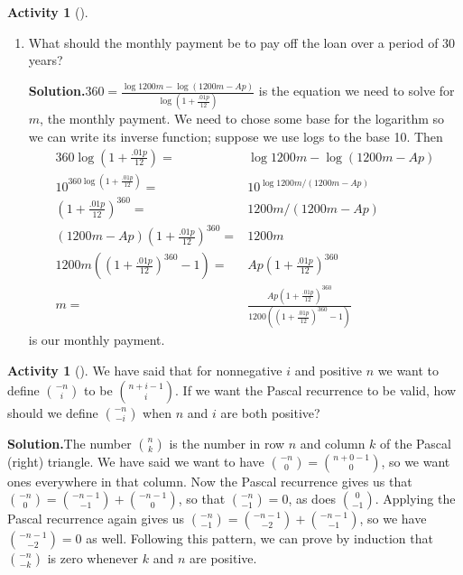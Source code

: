 \documentclass[10pt,]{book}
\theoremstyle{plain}
\theoremstyle{definition}
\newtheorem{activity}[project]{Activity}
\numberwithin{equation}{chapter}
\newcommand{\amp}{&}
\begin{document}
\begin{activity}[]
\begin{enumerate}[label=(\alph*)]
~\par
\item What should the monthly payment be to pay off the loan over a period of 30 years?%
\par\medskip\noindent%
\textbf{Solution.}\quad \(360=\frac{\log
1200m-\log (1200m-Ap)}{\log (1+\frac{.01p}{12})}\) is the equation we need to solve for \(m\), the monthly payment. We need to chose some base for the logarithm so we can write its inverse function; suppose we use logs to the base 10. Then%
\begin{align*}
360\log (1+\frac{.01p}{12})  =\amp  \log
1200m-\log (1200m-Ap)\\
10^{360\log (1+\frac{.01p}{12})} =\amp 10^{\log
1200m/(1200m-Ap)}\\
(1+\frac{.01p}{12})^{360}  =\amp 1200m/(1200m-Ap)\\
\left(1200m-Ap\right)(1+\frac{.01p}{12})^{360} =\amp 1200m\\
1200m\left((1+\frac{.01p}{12})^{360}-1\right) =\amp  Ap(1+\frac{.01p}{12})^{360}\\
m  =\amp  \frac{Ap(1+\frac{.01p}{12})^{360}}{1200\left((1+\frac{.01p}{12})^{360}-1\right)}
\end{align*}
is our monthly payment.%

\end{enumerate}
\end{activity}
\begin{activity}[]\label{activity-199}
We have said that for nonnegative \(i\) and positive \(n\) we want to define \(\binom{-n}{i}\) to be \(\binom{n+i-1}{i}\). If we want the Pascal recurrence to be valid, how should we define \(\binom{-n}{-i}\) when \(n\) and \(i\) are both positive?%
\par\medskip\noindent%
\textbf{Solution.}\quad The number \(\binom{n}{k}\) is the number in row \(n\) and column \(k\) of the Pascal (right) triangle. We have said we want to have \(\binom{-n}{0}=\binom{n+0-1}{0}\), so we want ones everywhere in that column. Now the Pascal recurrence gives us that \(\binom{-n}{0}=\binom{-n-1}{-1} +\binom{-n-1}{0}\), so that \(\binom{-n}{-1}=0\), as does \(\binom{0}{-1}\). Applying the Pascal recurrence again gives us \(\binom{-n}{-1}= \binom{-n-1}{-2} +\binom{-n-1}{-1}\), so we have \(\binom{-n-1}{-2}=0\) as well. Following this pattern, we can prove by induction that \(\binom{-n}{-k}\) is zero whenever \(k\) and \(n\) are positive.%
\end{activity}
\end{document}
